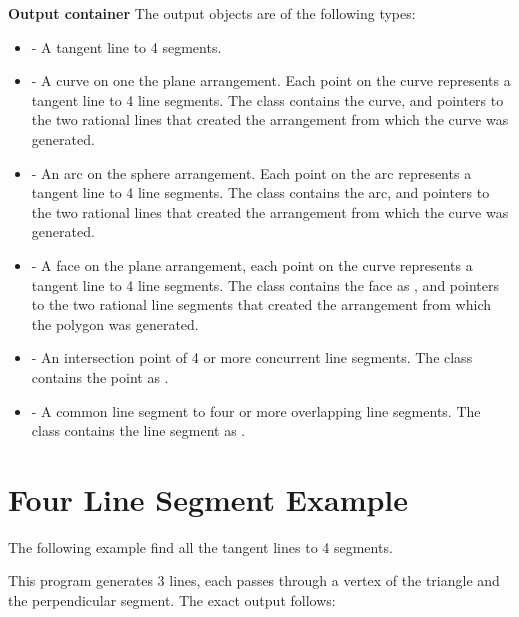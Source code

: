 {\bf Output container}\newline
The output objects are of the following types:
\begin{itemize}
\item
{} - A tangent line to 4 segments.
\item
{} - A curve on one the plane arrangement. Each point on the curve represents a tangent line to 4 line segments.
The class contains the curve, and pointers to the two rational lines that created the arrangement from which the curve was generated.
\item
{} - An arc on the sphere arrangement. Each point on the arc represents a tangent line to 4 line segments.
The class contains the arc, and pointers to the two rational lines that created the arrangement from which the curve was generated.
\item
{} - A face on the plane arrangement,  each point on the curve represents a tangent line to 4 line segments.
The class contains the face as , and pointers to the two rational line segments that created the arrangement from which the polygon was generated.
\item
{} - An intersection point of 4 or more concurrent line segments.
The class contains the point as .
\item
{} - A common line segment to four or more overlapping line segments.
The class contains the line segment as .
\end{itemize}


\section{Four Line Segment Example}
The following example find all the tangent lines to 4 segments.


This program generates 3 lines, each passes through a vertex of the triangle and the perpendicular segment. The exact output follows:

